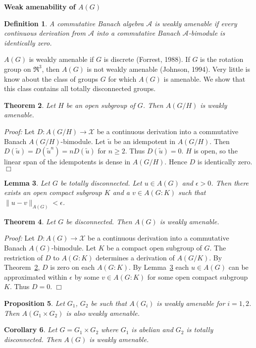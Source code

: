 \documentclass[landscape]{slides}
\newtheorem{defn}{Definition}
\newtheorem{theorem}[defn]{Theorem}
\newtheorem{prop}[defn]{Proposition}
\newtheorem{cor}[defn]{Corollary}
\newtheorem{lemma}[defn]{Lemma}
\begin{document}
\begin{slide}
\textbf{Weak amenability of $A(G)$}

\begin{defn}
A commutative Banach algebra $\mathcal{A}$ is weakly amenable if every continuous derivation
from $\mathcal{A}$ into a commutative Banach $\mathcal{A}$-bimodule is identically zero.
\end{defn}

$A(G)$ is weakly amenable if $G$ is discrete (Forrest, 1988).  If $G$ is the rotation group
on $\Re ^3$, then $A(G)$ is not weakly amenable (Johnson, 1994).  Very little is know about the class of groups
$G$ for which $A(G)$ is amenable.  We show that this class contains all totally disconnected
groups.
\end{slide}

\begin{slide}
\begin{theorem}\label{5.1}
Let $H$ be an open subgroup of $G$.  Then $A(G/H)$ is weakly amenable.
\end{theorem}
{\it Proof:}  Let $D: A(G/H) \rightarrow \mathcal{X}$ be a continuous derivation into a 
commutative Banach $A(G/H)$-bimodule.  Let $\tilde{u}$ be an idempotent in $A(G/H)$.
Then $D(\tilde{u}) = D(\tilde{u}^n) = nD(\tilde{u})$ for $n\geq 2$.  Thus $D(\tilde{u}) = 0$.
$H$ is open, so the linear span of the idempotents is dense in $A(G/H)$.  Hence $D$ is
identically zero.$\Box$

\begin{lemma}\label{5.2}
Let $G$ be totally disconnected.  Let $u\in A(G)$ and $\epsilon > 0$.  Then there
exists an open compact subgroup $K$ and a $v\in A(G:K)$ such that $\|u-v\|_{A(G)} < \epsilon$.
\end{lemma}
\end{slide}

\begin{slide}
\begin{theorem}
Let $G$ be disconnected.  Then $A(G)$ is weakly amenable.
\end{theorem}
{\it Proof:}  Let $D: A(G) \rightarrow \mathcal{X}$ be a continuous derivation into a 
commutative Banach $A(G)$-bimodule.  Let $K$ be a compact open subgroup of $G$.  The
restriction of $D$ to $A(G:K)$ determines a derivation of $A(G/K)$.  By Theorem~\ref{5.1},
$D$ is zero on each $A(G:K)$.  By Lemma~\ref{5.2} each $u\in A(G)$ can be approximated
within $\epsilon$ by some $v\in A(G:K)$ for some open compact subgroup $K$.  Thus $D=0$.
$\Box$

\begin{prop}
Let $G_1$, $G_2$ be such that $A(G_i)$ is weakly amenable for $i=1,2$.  Then
$A(G_1 \times G_2)$ is also weakly amenable.
\end{prop}

\begin{cor}
Let $G=G_1 \times G_2$ where $G_1$ is abelian and $G_2$ is totally disconnected.  Then
$A(G)$ is weakly amenable.
\end{cor}
\end{slide}

\end{document}
